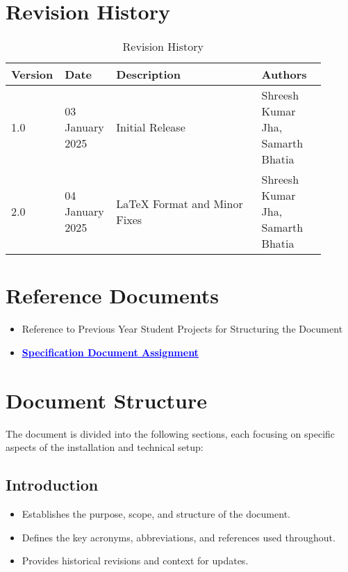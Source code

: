 \section{Revision History}
\label{sec:revision_history}

\begin{table}[H]
    \centering
    \begin{tabular}{ |p{0.1\linewidth}|p{0.15\linewidth}|p{0.45\linewidth}|p{0.2\linewidth}| }
        \hline
        \textbf{Version} & \textbf{Date} & \textbf{Description} & \textbf{Authors} \\
        \hline
        1.0 & 03 January 2025 & Initial Release & 
        Shreesh Kumar Jha, \newline
        Samarth Bhatia \\
        \hline
        2.0 & 04 January 2025 & LaTeX Format and Minor Fixes & 
        Shreesh Kumar Jha, \newline
        Samarth Bhatia \\
        \hline
    \end{tabular}
    \caption{Revision History}
    \label{tab:revision_history}
\end{table}

\section{Reference Documents}
\label{sec:reference_documents}%
\begin{itemize}
    \item Reference to Previous Year Student Projects for Structuring the Document
    \item \href{https://github.com/JhaBhatiaSharma/JhaBhatiaSharma/tree/main/RASD\%20Doc}{\textbf{\textcolor{blue}{\underline{Specification Document Assignment}}}}
\end{itemize}

\section{Document Structure}
\label{sec:document_structure}%
The document is divided into the following sections, each focusing on specific aspects of the installation and technical setup:

\subsection*{Introduction}
\begin{itemize}
    \item Establishes the purpose, scope, and structure of the document.
    \item Defines the key acronyms, abbreviations, and references used throughout.
    \item Provides historical revisions and context for updates.
\end{itemize}

